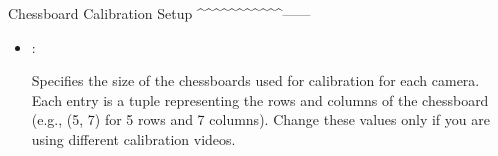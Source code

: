 \documentclass[letterpaper,10pt,english]{sphinxmanual}
\begin{document}
\sphinxAtStartPar
Chessboard Calibration Setup
\textasciicircum{}\textasciicircum{}\textasciicircum{}\textasciicircum{}\textasciicircum{}\textasciicircum{}\textasciicircum{}\textasciicircum{}\textasciicircum{}\textasciicircum{}\textasciicircum{}——\sphinxhyphen{}
\begin{itemize}
\item {} 
\sphinxAtStartPar
{}: 

\sphinxAtStartPar
Specifies the size of the chessboards used for calibration for each camera. Each entry is a tuple representing the rows and columns of the chessboard (e.g., (5, 7) for 5 rows and 7 columns). Change these values only if you are using different calibration videos.

\end{itemize}
\end{document}
